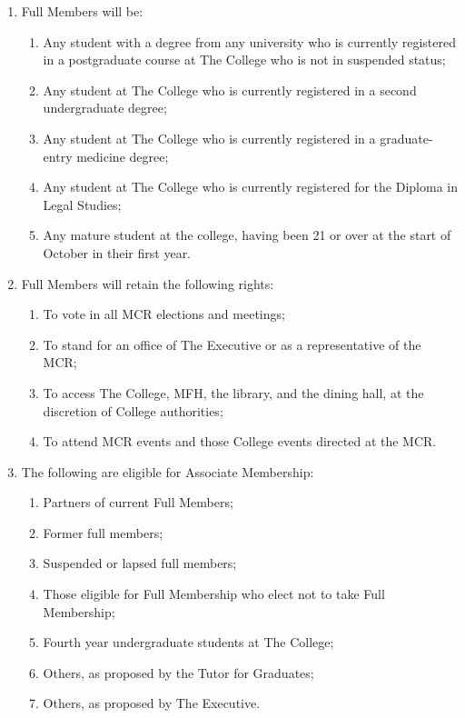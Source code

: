 \documentclass[11pt, a4paper]{article}
\begin{document}
\begin{enumerate}
    \item Full Members will be:
    \begin{enumerate}
        \item Any student with a degree from any university who is currently registered in a postgraduate course at The College who is not in suspended status;
        \item Any student at The College who is currently registered in a second undergraduate degree;
        \item Any student at The College who is currently registered in a graduate-entry medicine degree;
        \item Any student at The College who is currently registered for the Diploma in Legal Studies;
        \item Any mature student at the college, having been 21 or over at the start of October in their first year.
    \end{enumerate}
    \item Full Members will retain the following rights:
    \begin{enumerate}
        \item To vote in all MCR elections and meetings;
        \item To stand for an office of The Executive or as a representative of the MCR;
        \item To access The College, MFH, the library, and the dining hall, at the discretion of College authorities;
        \item To attend MCR events and those College events directed at the MCR.
    \end{enumerate}
    \item The following are eligible for Associate Membership:
    \begin{enumerate}
        \item Partners of current Full Members;
        \item Former full members;
        \item Suspended or lapsed full members;
        \item Those eligible for Full Membership who elect not to take Full Membership;
        \item Fourth year undergraduate students at The College;
        \item Others, as proposed by the Tutor for Graduates;
        \item Others, as proposed by The Executive.

\end{enumerate}
\end{enumerate}
\end{document}
